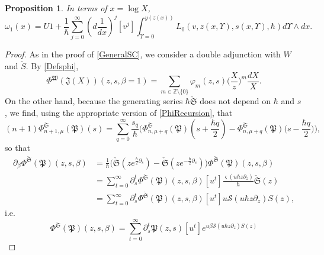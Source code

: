 \documentclass[10pt,a4paper,oneside,no-math,reqno]{amsart}%
\theoremstyle{plain}
\newtheorem{proposition}[theorem]{Proposition}
\theoremstyle{definition}
\theoremstyle{remark}
\numberwithin{equation}{section}
\renewcommand{\phi}{\varphi}
\newcommand{\mb}[1]{\mathbb{#1}}
\newcommand{\mf}[1]{\mathfrak{#1}}
\newcommand{\mc}[1]{\mathcal{#1}}
\newcommand{\1}{\mathds{1}}
\newcommand{\Z}{\mb{Z}}
\newcommand{\<}{\langle}
\renewcommand{\>}{\rangle}
\newcommand{\del}{\partial}
\begin{document}
\begin{proposition}
	In terms of $ x = \log X$,
	\begin{equation}\label{FormulaForn=1}
		\omega_1 (x)
		=
	    U 1 + \frac{1}{\hbar}\sum_{j=0}^\infty (d \frac{1}{dx})^j [v^j] \int_{\Upsilon=0}^{y(z(x))} L_0(v, z(x,\Upsilon), s(x,\Upsilon),\hbar) d\Upsilon \wedge dx .
\end{equation}
\end{proposition}

\begin{proof}
    As in the proof of \cref{GeneralSC}, we consider a double adjunction with $ W$ and $ \check{S}$. By \cref{Defsphi}, 
    \begin{equation}
        \Phi^{\mf{W}} (\mf{J} (X) ) (z,s, \beta = 1)
        =
        \sum_{m \in \Z \setminus \{ 0\} } \phi_m (z,s) \Big( \frac{X}{z} \Big)^m \frac{dX}{X}.
    \end{equation}
    On the other hand, because the generating series $ \hbar \check{\mf{S}} $ does not depend on $\hbar$ and $s$, we find, using the appropriate version of \cref{PhiRecursion}, that
    \begin{equation}
        (n+1) \Phi^{\check{\mf{S}}}_{n+1,\mu} (\mf{P}) (s) 
		=
		\sum_{q = 0}^\infty \frac{s_q}{\hbar} \Big( \Phi^{\check{\mf{S}}}_{n, \mu+q}(\mf{P}) ( s + \frac{\hbar q}{2}) - \Phi^{\check{\mf{S}}}_{n,\mu+q} (\mf{P}) \big( s - \frac{\hbar q}{2}\big) \Big),
	\end{equation}
    so that
    \begin{equation}
        \begin{split}
            \del_\beta \Phi^{\check{\mf{S}}} ( \mf{P}) (z,s,\beta) 
            &=
            \frac{1}{\hbar} \Big( \check{\mf{S}} (z e^{\frac{\hbar}{2} \del_s}) - \check{\mf{S}} (z e^{-\frac{\hbar}{2} \del_s}) \Big) \Phi^{\check{\mf{S}}}(\mf{P}) ( z, s, \beta)
            \\
            &=
            \sum_{t=0}^\infty \del_s^t \Phi^{\check{\mf{S}}} (\mf{P}) ( z, s, \beta) [u^t] \frac{\varsigma ( u \hbar z \del_z)}{\hbar} \check{\mf{S}}(z) 
            \\
            &=
            \sum_{t=0}^\infty \del_s^t \Phi^{\check{\mf{S}}} (\mf{P}) ( z, s, \beta) [u^t] u \mc{S} ( u \hbar z \del_z) S(z) ,
        \end{split}
    \end{equation}
    i.e.
    \begin{equation}
        \Phi^{\check{\mf{S}}} ( \mf{P}) (z,s,\beta) 
        =
        \sum_{t=0}^\infty \del_s^t \mf{P} ( z, s) [u^t] e^{u \beta \mc{S} ( u \hbar z \del_z) S(z)}

\end{equation}
\end{proof}
\end{document}
